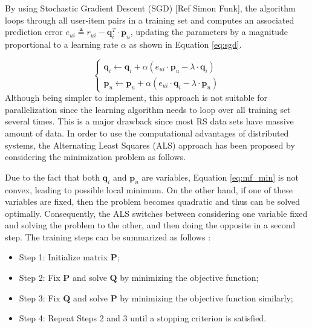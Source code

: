     By using Stochastic Gradient Descent (SGD)  [Ref Simon Funk], the algorithm loops through all user-item pairs in a training set and computes an associated prediction error $e_{ui} \triangleq r_{ui} - \mathbf{q}^T_i \cdot \mathbf{p}_u$, updating the parameters by a magnitude proportional to a learning rate $\alpha$ as shown in Equation \ref{eq:sgd}.
    
    \begin{equation}
        \label{eq:sgd}
            \begin{cases}
            \mathbf{q}_i \leftarrow \mathbf{q}_i + \alpha (e_{ui}\cdot \mathbf{p}_u-\lambda \cdot \mathbf{q}_i) \\
            
            \mathbf{p}_u \leftarrow \mathbf{p}_u + \alpha (e_{ui}\cdot \mathbf{q}_i-\lambda \cdot \mathbf{p}_u)
            \end{cases}
    \end{equation} Although being simpler to implement, this approach is not suitable for parallelization since the learning algorithm needs to loop over all training set several times. This is a major drawback since most RS data sets have massive amount of data. In order to use the computational advantages of distributed systems, the Alternating Least Squares (ALS)  approach has been proposed by considering the minimization problem as follows.

    
    Due to the fact that both $\mathbf{q}_i$ and $\mathbf{p}_u$ are variables, Equation \ref{eq:mf_min} is not convex, leading to possible local minimum. On the other hand, if one of these variables are fixed, then the problem becomes quadratic and thus can be solved optimally. Consequently, the ALS switches between considering one variable fixed and solving the problem to the other, and then doing the opposite in a second step. The training steps can be summarized as follows \cite{2008ALSWR}:
    
    \begin{itemize}
        \item Step 1: Initialize matrix $\mathbf{P}$;
        \item Step 2: Fix $\mathbf{P}$ and solve $\mathbf{Q}$ by minimizing the objective function;
        \item Step 3: Fix $\mathbf{Q}$ and solve $\mathbf{P}$ by minimizing the objective function similarly;
        \item Step 4: Repeat Steps 2 and 3 until a stopping criterion is satisfied.
    \end{itemize}
    
